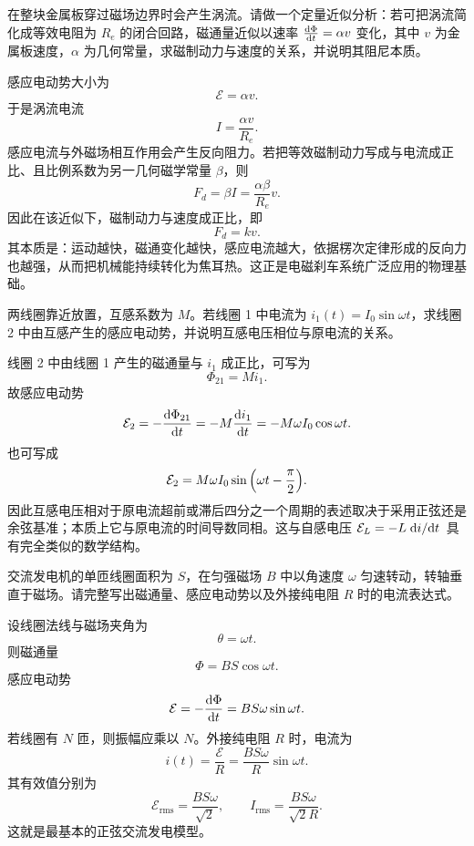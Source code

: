 \begin{competition}
在整块金属板穿过磁场边界时会产生涡流。请做一个定量近似分析：若可把涡流简化成等效电阻为 $R_e$ 的闭合回路，磁通量近似以速率 $\dv{\Phi}{t}=\alpha v$ 变化，其中 $v$ 为金属板速度，$\alpha$ 为几何常量，求磁制动力与速度的关系，并说明其阻尼本质。

\begin{solution}
感应电动势大小为
\[
\mathcal{E}=\alpha v.
\]
于是涡流电流
\[
I=\frac{\alpha v}{R_e}.
\]
感应电流与外磁场相互作用会产生反向阻力。若把等效磁制动力写成与电流成正比、且比例系数为另一几何磁学常量 $\beta$，则
\[
F_d=\beta I=\frac{\alpha\beta}{R_e}v.
\]
因此在该近似下，磁制动力与速度成正比，即
\[
F_d=kv.
\]
其本质是：运动越快，磁通变化越快，感应电流越大，依据楞次定律形成的反向力也越强，从而把机械能持续转化为焦耳热。这正是电磁刹车系统广泛应用的物理基础。
\end{solution}
\end{competition}

\begin{competition}
两线圈靠近放置，互感系数为 $M$。若线圈 1 中电流为 $i_1(t)=I_0\sin\omega t$，求线圈 2 中由互感产生的感应电动势，并说明互感电压相位与原电流的关系。

\begin{solution}
线圈 2 中由线圈 1 产生的磁通量与 $i_1$ 成正比，可写为
\[
\Phi_{21}=Mi_1.
\]
故感应电动势
\[
\mathcal{E}_2=-\dv{\Phi_{21}}{t}=-M\dv{i_1}{t}=-M\omega I_0\cos\omega t.
\]
也可写成
\[
\mathcal{E}_2=M\omega I_0\sin\qty(\omega t-\frac{\pi}{2}).
\]
因此互感电压相对于原电流超前或滞后四分之一个周期的表述取决于采用正弦还是余弦基准；本质上它与原电流的时间导数同相。这与自感电压 $\mathcal{E}_L=-L\dv*{i}{t}$ 具有完全类似的数学结构。
\end{solution}
\end{competition}

\begin{university}
交流发电机的单匝线圈面积为 $S$，在匀强磁场 $B$ 中以角速度 $\omega$ 匀速转动，转轴垂直于磁场。请完整写出磁通量、感应电动势以及外接纯电阻 $R$ 时的电流表达式。

\begin{center}
\end{center}

\begin{solution}
设线圈法线与磁场夹角为
\[
\theta=\omega t.
\]
则磁通量
\[
\Phi=BS\cos\omega t.
\]
感应电动势
\[
\mathcal{E}=-\dv{\Phi}{t}=BS\omega\sin\omega t.
\]
若线圈有 $N$ 匝，则振幅应乘以 $N$。外接纯电阻 $R$ 时，电流为
\[
i(t)=\frac{\mathcal{E}}{R}=\frac{BS\omega}{R}\sin\omega t.
\]
其有效值分别为
\[
\mathcal{E}_{\text{rms}}=\frac{BS\omega}{\sqrt{2}},
\qquad
I_{\text{rms}}=\frac{BS\omega}{\sqrt{2}R}.
\]
这就是最基本的正弦交流发电模型。
\end{solution}
\end{university}


